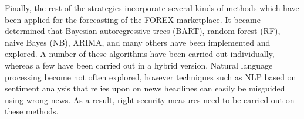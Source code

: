 Finally, the rest of the strategies incorporate several kinds of methods which have been applied for the forecasting of the FOREX marketplace. It became determined that Bayesian autoregressive trees (BART), random forest (RF), naive Bayes (NB), ARIMA, and many others have been implemented and explored. A number of these algorithms have been carried out individually, whereas a few have been carried out in a hybrid version. Natural language processing become not often explored, however techniques such as NLP based on sentiment analysis that relies upon on news headlines \cite{Seifollahi} can easily be misguided using wrong news. As a result, right security measures need to be carried out on these methods.

